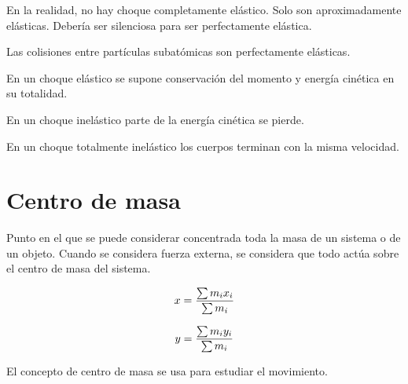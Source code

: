 \documentclass[12pt]{article}
\begin{document}
En la realidad,
no hay choque completamente elástico.
Solo son aproximadamente elásticas.
Debería ser silenciosa para ser perfectamente elástica.

Las colisiones entre partículas subatómicas son perfectamente elásticas.

En un choque elástico se supone conservación del momento y energía cinética 
en su totalidad.

En un choque inelástico parte de la energía cinética se pierde.

En un choque totalmente inelástico los cuerpos terminan con la misma velocidad.

\section{Centro de masa}

Punto en el que se puede considerar concentrada toda la masa de un sistema 
o de un objeto.
Cuando se considera fuerza externa, se considera que todo actúa sobre el 
centro de masa del sistema.

\begin{equation}
    x = \frac{\sum m_{i}x_{i}}{\sum m_{i}}\\
\end{equation}

\begin{equation}
    y = \frac{\sum m_{i}y_{i}}{\sum m_{i}}\\
\end{equation}

El concepto de centro de masa se usa para estudiar el movimiento.
\end{document}
